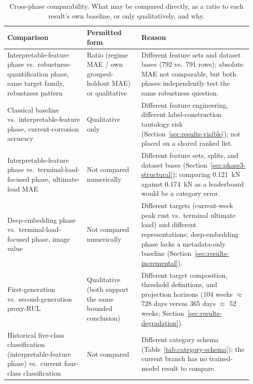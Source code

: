 \begin{table}[htbp]
\centering
\caption{Cross-phase comparability. What may be compared directly, as a
ratio to each result's own baseline, or only qualitatively, and why.}
\label{tab:cross-phase-comparability}
\small
\begin{tabular}{p{3.2cm}p{3.3cm}p{6.0cm}}
\toprule
Comparison & Permitted form & Reason \\
\midrule
Interpretable-feature phase vs.\ robustness-quantification phase, same
target family, robustness pattern & Ratio (regime MAE / own
grouped-holdout MAE) or qualitative & Different feature sets and dataset
bases (792 vs.\ 791 rows); absolute MAE not comparable, but both phases
independently test the same robustness question. \\
Classical baseline vs.\ interpretable-feature phase, current-corrosion
accuracy & Qualitative only & Different feature engineering, different
label-construction tautology risk (Section~\ref{sec:results-visible}); not
placed on a shared ranked list. \\
Interpretable-feature phase vs.\ terminal-load-focused phase, ultimate-load
MAE & Not compared numerically & Different feature sets, splits, and
dataset bases (Section~\ref{sec:phase3-structural}); comparing 0.121~kN
against 0.174~kN as a leaderboard would be a category error. \\
Deep-embedding phase vs.\ terminal-load-focused phase, image value & Not
compared numerically & Different targets (current-week peak rust vs.\
terminal ultimate load) and different representations; deep-embedding
phase lacks a metadata-only baseline (Section~\ref{sec:results-incremental}). \\
First-generation vs.\ second-generation proxy-RUL & Qualitative (both
support the same bounded conclusion) & Different target composition,
threshold definitions, and projection horizons (104 weeks $\approx$ 728
days versus 365 days $\approx$ 52 weeks;
Section~\ref{sec:results-degradation}). \\
Historical five-class classification (interpretable-feature phase) vs.\
current four-class classification & Not compared & Different category
schema (Table~\ref{tab:category-schema}); the current branch has no
trained-model result to compare. \\
\bottomrule
\end{tabular}
\end{table}

\FloatBarrier


